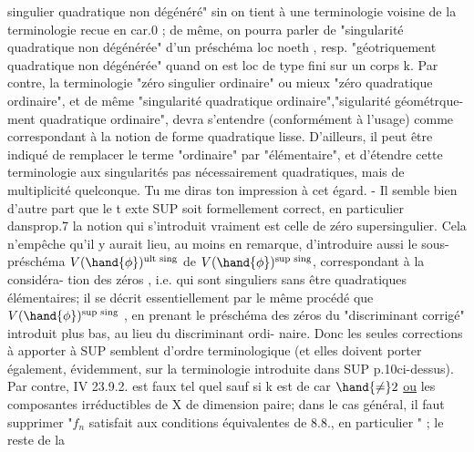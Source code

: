 
singulier quadratique  non dégénéré" sin on tient à une terminologie
voisine de la terminologie  recue en car.0 ; de même, on pourra
parler de "singularité quadratique non dégénérée" d'un préschéma loc
noeth , resp. "géotriquement  quadratique non dégénérée" quand on est
loc de type fini sur un corps k.  Par contre, la terminologie
"zéro singulier ordinaire" ou mieux "zéro quadratique ordinaire",
et de même "singularité quadratique ordinaire","sigularité géométrque-%
ment quadratique ordinaire",  devra s'entendre (conformément à l'usage)
comme correspondant à la notion de forme quadratique lisse. D'ailleurs,
il peut être indiqué de remplacer le terme "ordinaire" par "élémentaire",
et d'étendre cette terminologie aux singularités pas nécessairement
quadratiques, mais de multiplicité quelconque. Tu me diras ton impression
à cet égard.   -    Il semble bien d'autre part que le t exte SUP soit
formellement correct, en particulier dans\hand{/}prop.7  la notion qui s'introduit
vraiment est celle de zéro supersingulier.  Cela n'empêche qu'il y aurait
lieu, au moins en remarque, d'introduire aussi  le sous-%
préschéma  $V(\hand{\phi})^{\text{ult sing}}$  de $V(\hand{\phi})^{\text{sup sing}}$, correspondant à la considéra-%
tion des zéros , i.e.  qui sont singuliers sans être
quadratiques élémentaires; il se décrit essentiellement par le même
procédé que $V(\hand{\phi})^{\text{sup sing}}$  , en prenant le préschéma des zéros du
"discriminant corrigé"  introduit plus bas, au lieu du discriminant ordi-%
naire.  Donc les seules corrections à apporter à SUP semblent d'ordre
terminologique (et elles doivent porter également, évidemment, sur la
terminologie
introduite dans SUP p.10\hand{/}ci-dessus).  Par contre,  IV 23.9.2. est faux tel quel
sauf si k est de car $\hand{\neq} 2$ \uline{ou} les composantes irréductibles de X  de
dimension paire; dans le cas général, il faut supprimer "$f_n$ satisfait
aux conditions équivalentes de 8.8., en particulier " ; le reste de la

